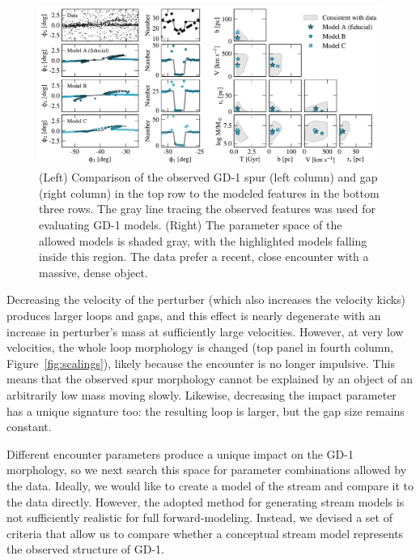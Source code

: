 \documentclass[twocolumn]{aastex62}
\begin{document}
\begin{figure}
\begin{center}
\includegraphics[width=\textwidth]{param_search.pdf}
\end{center}
\caption{(Left) Comparison of the observed GD-1 spur (left column) and gap (right column) in the top row to the modeled features in the bottom three rows. 
The gray line tracing the observed features was used for evaluating GD-1 models.
(Right) The parameter space of the allowed models is shaded gray, with the highlighted models falling inside this region.
The data prefer a recent, close encounter with a massive, dense object.
}
\label{fig:corner}
\end{figure}

Decreasing the velocity of the perturber (which also increases the velocity kicks) produces larger loops and gaps, and this effect is nearly degenerate with an increase in perturber's mass at sufficiently large velocities.
However, at very low velocities, the whole loop morphology is changed (top panel in fourth column, Figure~\ref{fig:scalings}), likely because the encounter is no longer impulsive.
This means that the observed spur morphology cannot be explained by an object of an arbitrarily low mass moving slowly.
Likewise, decreasing the impact parameter has a unique signature too: the resulting loop is larger, but the gap size remains constant.

Different encounter parameters produce a unique impact on the GD-1 morphology, so we next search this space for parameter combinations allowed by the data.
Ideally, we would like to create a model of the stream and compare it to the data directly.
However, the adopted method for generating stream models is not sufficiently realistic for full forward-modeling.
Instead, we devised a set of criteria that allow us to compare whether a conceptual stream model represents the observed structure of GD-1.
\end{document}
